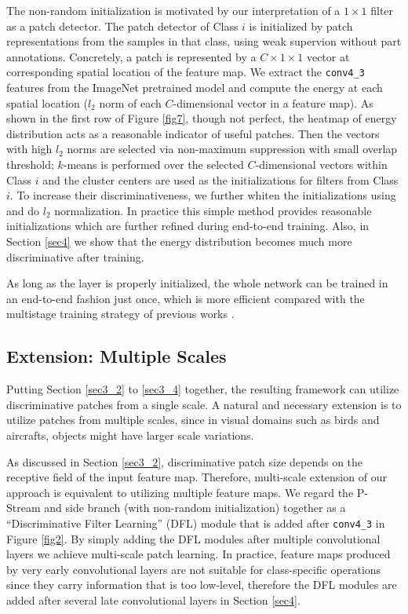 \documentclass[10pt,twocolumn,letterpaper]{article}
\begin{document}
The non-random initialization is motivated by our interpretation of a $1\times1$ filter as a patch detector.
The patch detector of Class $i$ is initialized by patch representations from the samples in
that class, using weak supervion without part annotations. Concretely, a patch is represented by a $C\times 1\times 1$ vector
at corresponding spatial location of the feature map. We extract the
\texttt{conv4\_3} features from the ImageNet pretrained model and compute the
energy at each spatial location ($l_2$ norm of each $C$-dimensional vector in a feature map). As shown in
the first row of Figure \ref{fig7}, though not perfect, the heatmap of energy distribution acts as a reasonable indicator of useful
patches. Then the vectors with high $l_2$ norms are selected via non-maximum suppression with small overlap threshold; $k$-means
is performed over the selected $C$-dimensional vectors within Class $i$ and the
cluster centers are used as the initializations for filters from
Class $i$. To increase their discriminativeness, we further whiten the initializations using \cite{ldadet} and do $l_2$
normalization. In practice this simple method provides reasonable initializations which are further refined during
end-to-end training. Also, in Section \ref{sec4} we show that the energy distribution becomes much more discriminative after training.

As long as the layer is properly initialized, the whole network can be trained in an end-to-end fashion just once, which is
more efficient compared with the multistage training strategy of previous works \cite{deeplac, spda_cnn, partstack}.

\subsection{Extension: Multiple Scales} \label{sec3_5}
Putting Section \ref{sec3_2} to \ref{sec3_4} together, the resulting framework can utilize discriminative patches
from a single scale. A natural and necessary extension is to utilize patches from multiple scales, since in visual
domains such as birds and aircrafts, objects might have larger scale variations.

As discussed in Section \ref{sec3_2}, discriminative patch size depends on the receptive field of
the input feature map. Therefore, multi-scale extension of our approach is equivalent to utilizing multiple feature
maps. We regard the P-Stream and side branch (with non-random initialization) together as a ``Discriminative Filter 
Learning'' (DFL) module that is added after \texttt{conv4\_3} in Figure \ref{fig2}. By simply
adding the DFL modules after multiple convolutional layers we achieve multi-scale patch learning. In practice,
feature maps produced by very early convolutional layers are not suitable for class-specific operations since
they carry information that is too low-level, therefore
the DFL modules are added after several late convolutional layers in Section \ref{sec4}.
\end{document}

